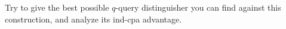 \documentclass[12pt]{article}
\newcommand{\bits}{\{0,1\}}
\newcommand{\getsr}{\stackrel{\$}{\gets}}
\newcommand{\Adv}{\textsf{Adv}}
\newcommand{\tab}{\hspace{0.3in}}
\newtheorem{claim}[theorem]{Claim}
\theoremstyle{definition}
\begin{document}
Try to give the best possible $q$-query distinguisher you can find against this construction, and analyze its ind-cpa advantage.

%
\end{document}
